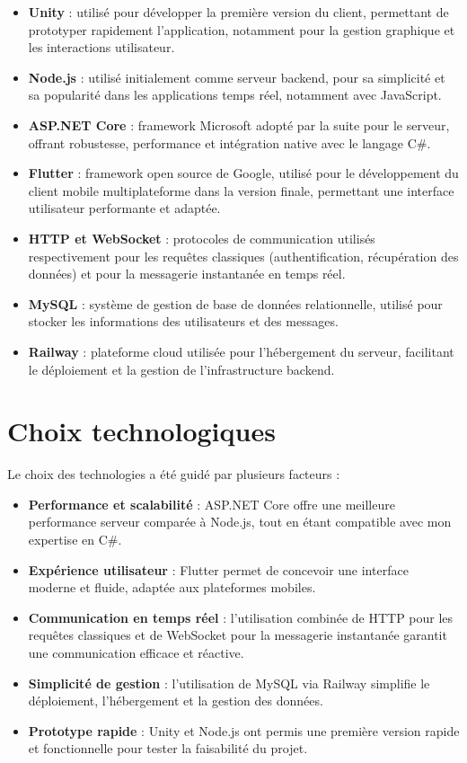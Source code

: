 \documentclass[12pt]{report}
\begin{document}
\begin{itemize}
	\item \textbf{Unity} : utilisé pour développer la première version du client, permettant de prototyper rapidement l’application, notamment pour la gestion graphique et les interactions utilisateur.
	\item \textbf{Node.js} : utilisé initialement comme serveur backend, pour sa simplicité et sa popularité dans les applications temps réel, notamment avec JavaScript.
	\item \textbf{ASP.NET Core} : framework Microsoft adopté par la suite pour le serveur, offrant robustesse, performance et intégration native avec le langage C\#.
	\item \textbf{Flutter} : framework open source de Google, utilisé pour le développement du client mobile multiplateforme dans la version finale, permettant une interface utilisateur performante et adaptée.
	\item \textbf{HTTP et WebSocket} : protocoles de communication utilisés respectivement pour les requêtes classiques (authentification, récupération des données) et pour la messagerie instantanée en temps réel.
	\item \textbf{MySQL} : système de gestion de base de données relationnelle, utilisé pour stocker les informations des utilisateurs et des messages.
	\item \textbf{Railway} : plateforme cloud utilisée pour l’hébergement du serveur, facilitant le déploiement et la gestion de l’infrastructure backend.
\end{itemize}

\section{Choix technologiques}

Le choix des technologies a été guidé par plusieurs facteurs :

\begin{itemize}
	\item \textbf{Performance et scalabilité} : ASP.NET Core offre une meilleure performance serveur comparée à Node.js, tout en étant compatible avec mon expertise en C\#.
	\item \textbf{Expérience utilisateur} : Flutter permet de concevoir une interface moderne et fluide, adaptée aux plateformes mobiles.
	\item \textbf{Communication en temps réel} : l’utilisation combinée de HTTP pour les requêtes classiques et de WebSocket pour la messagerie instantanée garantit une communication efficace et réactive.
	\item \textbf{Simplicité de gestion} : l’utilisation de MySQL via Railway simplifie le déploiement, l’hébergement et la gestion des données.
	\item \textbf{Prototype rapide} : Unity et Node.js ont permis une première version rapide et fonctionnelle pour tester la faisabilité du projet.
\end{itemize}
\end{document}
